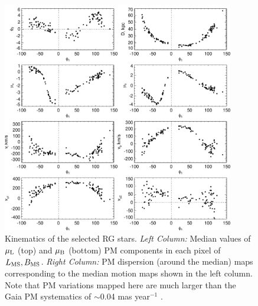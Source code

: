 \documentclass[a4paper,useAMS,usenatbib]{mnras}
\begin{document}
%
\begin{figure}
  \centering
  \includegraphics[width=0.9\textwidth]{orphan_paper_phi1_members.pdf}
  \caption[]{Kinematics of the selected RG stars. {\it Left Column:}
    Median values of $\mu_{\rm L}$ (top) and $\mu_{\rm B}$ (bottom) PM
    components in each pixel of $L_{\rm MS}, B_{\rm MS}$. {\it Right
      Column:} PM dispersion (around the median) maps corresponding to
    the median motion maps shown in the left column. Note that PM
    variations mapped here are much larger than the Gaia PM
    systematics of $\sim$0.04 mas year$^{-1}$ \citep[see][]{Arenou2018}.}
   \label{fig:memother}
\end{figure}
%
\end{document}
